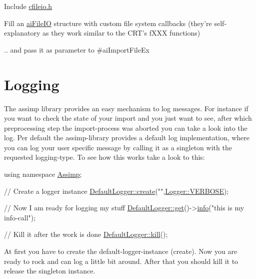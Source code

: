 \begin{DoxyItemize}
\item Include \hyperlink{cfileio_8h_source}{cfileio.\+h} 
\item Fill an \hyperlink{structai_file_i_o}{ai\+File\+I\+O} structure with custom file system callbacks (they're self-\/explanatory as they work similar to the C\+R\+T's f\+X\+X\+X functions) 
\item .. and pass it as parameter to \#ai\+Import\+File\+Ex 
\end{DoxyItemize}\hypertarget{usage_logging}{}\section{Logging}\label{usage_logging}
The assimp library provides an easy mechanism to log messages. For instance if you want to check the state of your import and you just want to see, after which preprocessing step the import-\/process was aborted you can take a look into the log. Per default the assimp-\/library provides a default log implementation, where you can log your user specific message by calling it as a singleton with the requested logging-\/type. To see how this works take a look to this\+:


\begin{DoxyCode}
\textcolor{keyword}{using namespace }\hyperlink{namespace_assimp}{Assimp};

\textcolor{comment}{// Create a logger instance }
\hyperlink{class_assimp_1_1_default_logger_a782e2e1b654703b5aaf4df764a35ef5f}{DefaultLogger::create}(\textcolor{stringliteral}{""},\hyperlink{class_assimp_1_1_logger_a8b6248a0fd062431e8572556350d29e6afc9d1d86aa82fdb80e00c99b3c1ce486}{Logger::VERBOSE});

\textcolor{comment}{// Now I am ready for logging my stuff}
\hyperlink{class_assimp_1_1_default_logger_a093cac26b06553ac774f84769cb0d691}{DefaultLogger::get}()->\hyperlink{class_assimp_1_1_logger_a12b8a125083c47ac0bb6056f00761e52}{info}(\textcolor{stringliteral}{"this is my info-call"});

\textcolor{comment}{// Kill it after the work is done}
\hyperlink{class_assimp_1_1_default_logger_af2adfcf8df6868b2a7a753ac166b4a0c}{DefaultLogger::kill}();
\end{DoxyCode}


At first you have to create the default-\/logger-\/instance (create). Now you are ready to rock and can log a little bit around. After that you should kill it to release the singleton instance.

